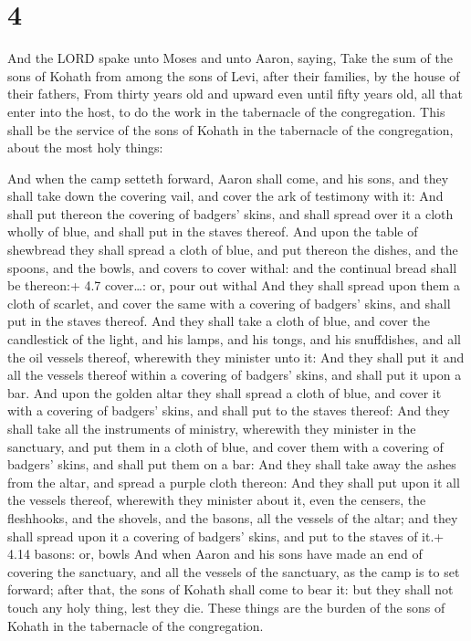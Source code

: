 \hypertarget{section-3}{%
\section{4}\label{section-3}}

 And the LORD spake unto Moses and unto Aaron, saying,
 Take the sum of the sons of Kohath from among the sons of
Levi, after their families, by the house of their fathers, 
From thirty years old and upward even until fifty years old, all that
enter into the host, to do the work in the tabernacle of the
congregation.  This shall be the service of the sons of
Kohath in the tabernacle of the congregation, about the most holy
things:

 And when the camp setteth forward, Aaron shall come, and
his sons, and they shall take down the covering vail, and cover the ark
of testimony with it:  And shall put thereon the covering of
badgers' skins, and shall spread over it a cloth wholly of blue, and
shall put in the staves thereof.  And upon the table of
shewbread they shall spread a cloth of blue, and put thereon the dishes,
and the spoons, and the bowls, and covers to cover withal: and the
continual bread shall be thereon:+ 4.7 cover\ldots: or, pour out withal
 And they shall spread upon them a cloth of scarlet, and
cover the same with a covering of badgers' skins, and shall put in the
staves thereof.  And they shall take a cloth of blue, and
cover the candlestick of the light, and his lamps, and his tongs, and
his snuffdishes, and all the oil vessels thereof, wherewith they
minister unto it:  And they shall put it and all the
vessels thereof within a covering of badgers' skins, and shall put it
upon a bar.  And upon the golden altar they shall spread a
cloth of blue, and cover it with a covering of badgers' skins, and shall
put to the staves thereof:  And they shall take all the
instruments of ministry, wherewith they minister in the sanctuary, and
put them in a cloth of blue, and cover them with a covering of badgers'
skins, and shall put them on a bar:  And they shall take
away the ashes from the altar, and spread a purple cloth thereon:
 And they shall put upon it all the vessels thereof,
wherewith they minister about it, even the censers, the fleshhooks, and
the shovels, and the basons, all the vessels of the altar; and they
shall spread upon it a covering of badgers' skins, and put to the staves
of it.+ 4.14 basons: or, bowls  And when Aaron and his sons
have made an end of covering the sanctuary, and all the vessels of the
sanctuary, as the camp is to set forward; after that, the sons of Kohath
shall come to bear it: but they shall not touch any holy thing, lest
they die. These things are the burden of the sons of Kohath in the
tabernacle of the congregation.

